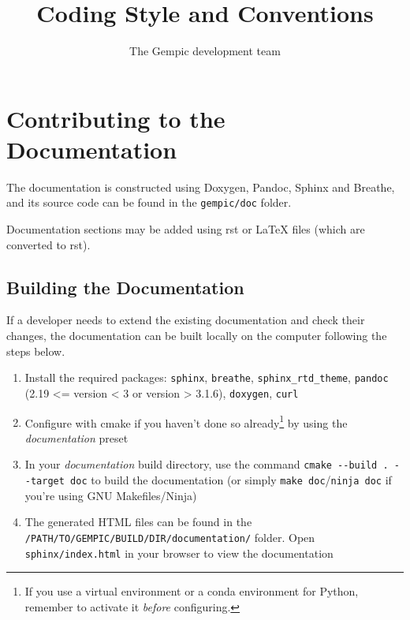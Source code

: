 \documentclass[11pt]{article}
\title{Coding Style and Conventions}
\author[1]{The Gempic development team}
\affil[1]{Max-Planck-Institut f\"ur Plasmaphysik, Garching, Germany}
\begin{document}
\maketitle

\tableofcontents

\section{Contributing to the Documentation}
The documentation is constructed using Doxygen, Pandoc, Sphinx and Breathe, and its source code can be found in the \verb|gempic/doc| folder.

Documentation sections may be added using rst or LaTeX files (which are converted to rst).

\subsection{Building the Documentation}
If a developer needs to extend the existing documentation and check their changes, the documentation can be built locally on the computer following the steps below. 
\begin{enumerate}
   \item Install the required packages: \verb|sphinx|, \verb|breathe|, \verb|sphinx_rtd_theme|, \verb|pandoc| (2.19 <= version < 3 or version > 3.1.6), \verb|doxygen|, \verb|curl|
   \item Configure with cmake if you haven't done so already\footnote{If you use a virtual environment or a conda environment for Python, remember to activate it \emph{before} configuring.} by using the \emph{documentation} preset
   \item In your \emph{documentation} build directory, use the command \verb|cmake --build . --target doc| to build the documentation (or simply \verb|make doc|/\verb|ninja doc| if you're using GNU Makefiles/Ninja)
   \item The generated HTML files can be found in the \verb|/PATH/TO/GEMPIC/BUILD/DIR/documentation/| folder. Open \verb|sphinx/index.html| in your browser to view the documentation
\end{enumerate}
\end{document}
